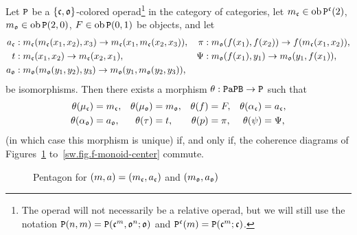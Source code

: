 \begin{theorem}\label{sw.thm.gen-rel-papb}
  Let $\mathtt{P}$ be a $\{\mathfrak{c}, \mathfrak{o}\}$-colored operad\footnote{The operad will not necessarily be a relative operad, but we will still use the notation $\mathtt{P}(n,m) = \mathtt{P}(\mathfrak{c}^{m}, \mathfrak{o}^{n}; \mathfrak{o})$ and $\mathtt{P}^{\mathfrak{c}}(m) = \mathtt{P}(\mathfrak{c}^{m}; \mathfrak{c})$.} in the category of categories, let $m_{\mathfrak{c}} \in \operatorname{ob} \mathtt{P}^{\mathfrak{c}}(2)$, $m_{\mathfrak{o}} \in \operatorname{ob} \mathtt{P}(2,0)$, $F \in \operatorname{ob} \mathtt{P}(0,1)$ be objects, and let
  \begin{align*}
    a_{\mathfrak{c}} & : m_{\mathfrak{c}}(m_{\mathfrak{c}}(x_{1}, x_{2}), x_{3}) \to m_{\mathfrak{c}}(x_{1},
    m_{\mathfrak{c}}(x_{2}, x_{3})),
    & \pi & : m_{\mathfrak{o}}(f(x_{1}), f(x_{2})) \to f(m_{\mathfrak{c}}(x_{1}, x_{2})), \\
    t & : m_{\mathfrak{c}}(x_{1}, x_{2}) \to m_{\mathfrak{c}}(x_{2}, x_{1}),
    & \Psi & : m_{\mathfrak{o}}(f(x_{1}), y_{1}) \to m_{\mathfrak{o}}(y_{1}, f(x_{1})), \\
    a_{\mathfrak{o}} & : m_{\mathfrak{o}}(m_{\mathfrak{o}}(y_{1}, y_{2}), y_{3}) \to m_{\mathfrak{o}}(y_{1},
    m_{\mathfrak{o}}(y_{2}, y_{3})),
  \end{align*}
  be isomorphisms.
  Then there exists a morphism $\theta : \mathtt{PaPB} \to \mathtt{P}$ such that
  \begin{align*}
    \theta(\mu_{\mathfrak{c}}) & = m_{\mathfrak{c}}, & \theta(\mu_{\mathfrak{o}}) & = m_{\mathfrak{o}}, & \theta(f) & = F, & \theta(\alpha_{\mathfrak{c}}) & = a_{\mathfrak{c}}, \\
    \theta(\alpha_{\mathfrak{o}}) & = a_{\mathfrak{o}}, & \theta(\tau) & = t, & \theta(p) & = \pi, & \theta(\psi) & = \Psi,
  \end{align*}
  (in which case this morphism is unique) if, and only if, the coherence diagrams of Figures~\ref{sw.fig.pentagons} to~\ref{sw.fig.f-monoid-center} commute.
\end{theorem}

\begin{figure}[htbp]
  \centering
  \caption{Pentagon for $(m, a) = (m_{\mathfrak{c}}, a_{\mathfrak{c}})$ and $(m_{\mathfrak{o}}, a_{\mathfrak{o}})$}
  \label{sw.fig.pentagons}
\end{figure}

